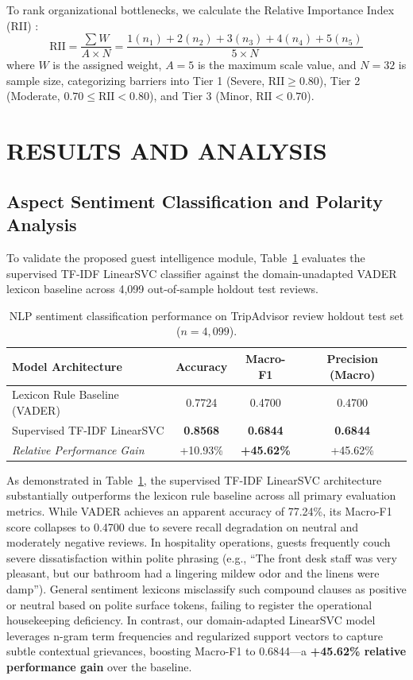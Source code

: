\documentclass[11pt,a4paper]{article}
\begin{document}
To rank organizational bottlenecks, we calculate the Relative Importance Index (RII) \cite{tam2004}:
\begin{equation}
\text{RII} = \frac{\sum W}{A \times N} = \frac{1(n_1) + 2(n_2) + 3(n_3) + 4(n_4) + 5(n_5)}{5 \times N}
\end{equation}
where $W$ is the assigned weight, $A = 5$ is the maximum scale value, and $N = 32$ is sample size, categorizing barriers into Tier 1 (Severe, $\text{RII} \ge 0.80$), Tier 2 (Moderate, $0.70 \le \text{RII} < 0.80$), and Tier 3 (Minor, $\text{RII} < 0.70$).

\section{RESULTS AND ANALYSIS}\label{sec:results}

\subsection{Aspect Sentiment Classification and Polarity Analysis}
To validate the proposed guest intelligence module, Table~\ref{tab:nlp_sentiment_benchmark} evaluates the supervised TF-IDF LinearSVC classifier against the domain-unadapted VADER lexicon baseline across 4,099 out-of-sample holdout test reviews.

\begin{table}[H]
\centering
\caption{NLP sentiment classification performance on TripAdvisor review holdout test set ($n=4{,}099$).}
\label{tab:nlp_sentiment_benchmark}
\begin{tabular}{lccc}
\toprule
\textbf{Model Architecture} & \textbf{Accuracy} & \textbf{Macro-F1} & \textbf{Precision (Macro)} \\
\midrule
Lexicon Rule Baseline (VADER) & 0.7724 & 0.4700 & 0.4700 \\
Supervised TF-IDF LinearSVC & \textbf{0.8568} & \textbf{0.6844} & \textbf{0.6844} \\
\midrule
\textit{Relative Performance Gain} & +10.93\% & \textbf{+45.62\%} & +45.62\% \\
\bottomrule
\end{tabular}
\end{table}

As demonstrated in Table~\ref{tab:nlp_sentiment_benchmark}, the supervised TF-IDF LinearSVC architecture substantially outperforms the lexicon rule baseline across all primary evaluation metrics. While VADER achieves an apparent accuracy of 77.24\%, its Macro-F1 score collapses to 0.4700 due to severe recall degradation on neutral and moderately negative reviews. In hospitality operations, guests frequently couch severe dissatisfaction within polite phrasing (e.g., ``The front desk staff was very pleasant, but our bathroom had a lingering mildew odor and the linens were damp''). General sentiment lexicons misclassify such compound clauses as positive or neutral based on polite surface tokens, failing to register the operational housekeeping deficiency. In contrast, our domain-adapted LinearSVC model leverages n-gram term frequencies and regularized support vectors to capture subtle contextual grievances, boosting Macro-F1 to 0.6844—a \textbf{+45.62\% relative performance gain} over the baseline.
\end{document}
